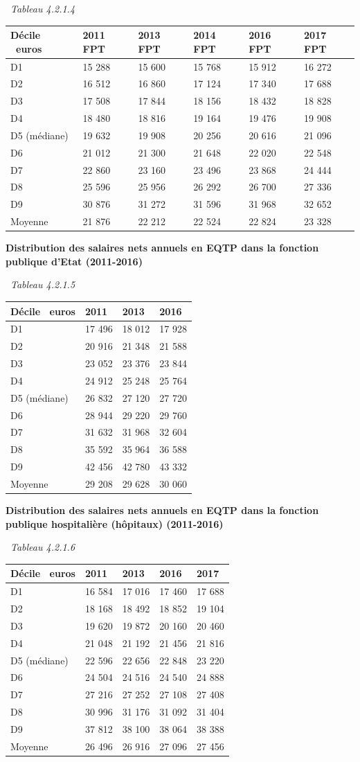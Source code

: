 ~\emph{Tableau 4.2.1.4}

\begin{longtable}[]{@{}llllll@{}}
\toprule
Décile ~euros & 2011 FPT & 2013 FPT & 2014 FPT & 2016 FPT & 2017
FPT\tabularnewline
\midrule
\endhead
D1 & 15 288 & 15 600 & 15 768 & 15 912 & 16 272\tabularnewline
D2 & 16 512 & 16 860 & 17 124 & 17 340 & 17 688\tabularnewline
D3 & 17 508 & 17 844 & 18 156 & 18 432 & 18 828\tabularnewline
D4 & 18 480 & 18 816 & 19 164 & 19 476 & 19 908\tabularnewline
D5 (médiane) & 19 632 & 19 908 & 20 256 & 20 616 & 21 096\tabularnewline
D6 & 21 012 & 21 300 & 21 648 & 22 020 & 22 548\tabularnewline
D7 & 22 860 & 23 160 & 23 496 & 23 868 & 24 444\tabularnewline
D8 & 25 596 & 25 956 & 26 292 & 26 700 & 27 336\tabularnewline
D9 & 30 876 & 31 272 & 31 596 & 31 968 & 32 652\tabularnewline
Moyenne & 21 876 & 22 212 & 22 524 & 22 824 & 23 328\tabularnewline
\bottomrule
\end{longtable}

\textbf{Distribution des salaires nets annuels en EQTP dans la fonction
publique d'Etat (2011-2016)}

~\emph{Tableau 4.2.1.5}

\begin{longtable}[]{@{}llll@{}}
\toprule
Décile ~euros & 2011 & 2013 & 2016\tabularnewline
\midrule
\endhead
D1 & 17 496 & 18 012 & 17 928\tabularnewline
D2 & 20 916 & 21 348 & 21 588\tabularnewline
D3 & 23 052 & 23 376 & 23 844\tabularnewline
D4 & 24 912 & 25 248 & 25 764\tabularnewline
D5 (médiane) & 26 832 & 27 120 & 27 720\tabularnewline
D6 & 28 944 & 29 220 & 29 760\tabularnewline
D7 & 31 632 & 31 968 & 32 604\tabularnewline
D8 & 35 592 & 35 964 & 36 588\tabularnewline
D9 & 42 456 & 42 780 & 43 332\tabularnewline
Moyenne & 29 208 & 29 628 & 30 060\tabularnewline
\bottomrule
\end{longtable}

\textbf{Distribution des salaires nets annuels en EQTP dans la fonction
publique hospitalière (hôpitaux) (2011-2016)}

~\emph{Tableau 4.2.1.6}

\begin{longtable}[]{@{}lllll@{}}
\toprule
Décile ~euros & 2011 & 2013 & 2016 & 2017\tabularnewline
\midrule
\endhead
D1 & 16 584 & 17 016 & 17 460 & 17 688\tabularnewline
D2 & 18 168 & 18 492 & 18 852 & 19 104\tabularnewline
D3 & 19 620 & 19 872 & 20 160 & 20 460\tabularnewline
D4 & 21 048 & 21 192 & 21 456 & 21 816\tabularnewline
D5 (médiane) & 22 596 & 22 656 & 22 848 & 23 220\tabularnewline
D6 & 24 504 & 24 516 & 24 540 & 24 888\tabularnewline
D7 & 27 216 & 27 252 & 27 108 & 27 408\tabularnewline
D8 & 30 996 & 31 176 & 31 092 & 31 404\tabularnewline
D9 & 37 812 & 38 100 & 38 064 & 38 388\tabularnewline
Moyenne & 26 496 & 26 916 & 27 096 & 27 456\tabularnewline
\bottomrule
\end{longtable}

